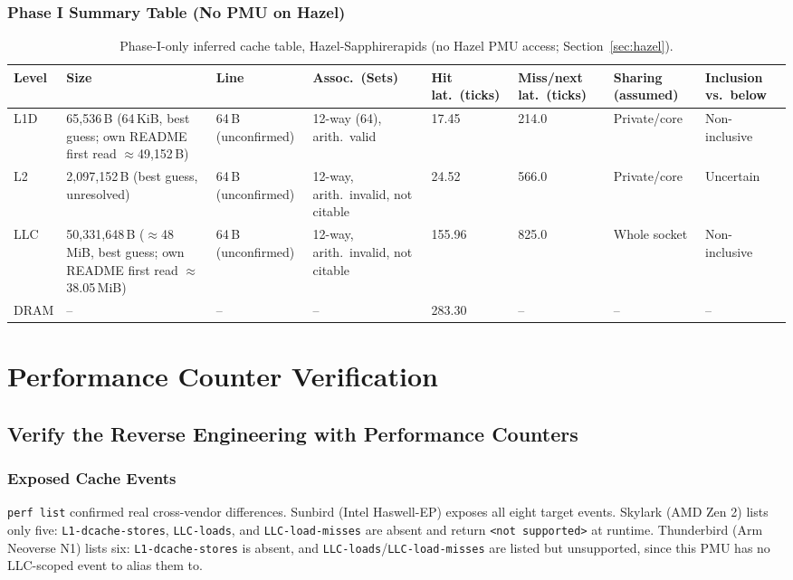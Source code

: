\documentclass{article}
\begin{document}
\subsubsection{Phase I Summary Table (No PMU on Hazel)}
\begin{table}[H]
\centering\scriptsize
\caption{Phase-I-only inferred cache table, Hazel-Sapphirerapids (no Hazel PMU access; Section~\ref{sec:hazel}).}
\begin{tabularx}{\textwidth}{|l|X|X|X|l|l|X|X|}
\hline
Level & Size & Line & Assoc.\ (Sets) & Hit lat.\ (ticks) & Miss/next lat.\ (ticks) & Sharing (assumed) & Inclusion vs.\ below\\
\hline
L1D & 65,536\,B (64\,KiB, best guess; own README first read $\approx$49,152\,B) & 64\,B (unconfirmed) & 12-way (64), arith.\ valid & 17.45 & 214.0 & Private/core & Non-inclusive\\
L2 & 2,097,152\,B (best guess, unresolved) & 64\,B (unconfirmed) & 12-way, arith.\ invalid, not citable & 24.52 & 566.0 & Private/core & Uncertain\\
LLC & 50,331,648\,B ($\approx$48\,MiB, best guess; own README first read $\approx$38.05\,MiB) & 64\,B (unconfirmed) & 12-way, arith.\ invalid, not citable & 155.96 & 825.0 & Whole socket & Non-inclusive\\
DRAM & -- & -- & -- & 283.30 & -- & -- & --\\
\hline
\end{tabularx}
\end{table}

\section{Performance Counter Verification}
\label{sec:pmu}

\subsection{Verify the Reverse Engineering with Performance Counters}

\subsubsection{Exposed Cache Events}
\texttt{perf list} confirmed real cross-vendor differences. Sunbird (Intel Haswell-EP) exposes all eight target events. Skylark (AMD Zen 2) lists only five: \texttt{L1-dcache-stores}, \texttt{LLC-loads}, and \texttt{LLC-load-misses} are absent and return \texttt{<not supported>} at runtime. Thunderbird (Arm Neoverse N1) lists six: \texttt{L1-dcache-stores} is absent, and \texttt{LLC-loads}/\texttt{LLC-load-misses} are listed but unsupported, since this PMU has no LLC-scoped event to alias them to.
\end{document}
